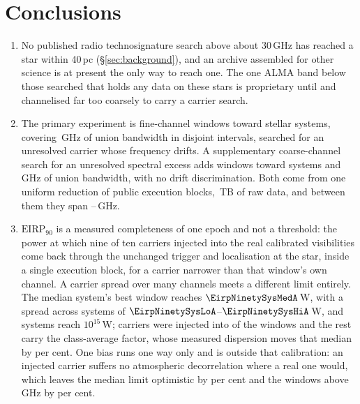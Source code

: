 \section{Conclusions}
\label{sec:conclusions}

\begin{enumerate}[leftmargin=1.6em,itemsep=4pt,topsep=4pt,parsep=0pt]

\item No published radio technosignature search above about 30\,GHz has
reached a star within 40\,pc (\S\ref{sec:background}), and an archive
assembled for other science is at present the only way to reach one. The one
ALMA band below those searched that holds any data on these stars is
proprietary until \SbBoneRelYear{} and channelised far too coarsely to carry
a carrier search.

\item The primary experiment is \NWinA{} fine-channel windows toward
\NSysClassA{} stellar systems, covering \CvUnionA\,GHz of union bandwidth in
\CovNIslands{} disjoint intervals, searched for an unresolved carrier whose
frequency drifts. A supplementary coarse-channel search for an unresolved spectral
excess adds \NWinB{} windows toward \PrSysClassB{} systems and
\CvUnionB\,GHz of union bandwidth, with no drift discrimination. Both come
from one uniform reduction of \NEB{} public execution blocks,
\TotalDataTB\,TB of raw data, and between them they span
\SurvFreqLo--\SurvFreqHi\,GHz.

\item $\mathrm{EIRP}_{90}$ is a measured completeness of one epoch and not a
threshold: the power at which nine of ten carriers
injected into the real calibrated visibilities come back through the
unchanged trigger and localisation at the star, inside a single execution
block, for a carrier narrower than that window's own channel. A carrier
spread over many channels meets a different limit entirely. The median
system's best window reaches $\EirpNinetySysMedA$\,W, with a spread across
systems of $\EirpNinetySysLoA$--$\EirpNinetySysHiA$\,W, and
\NSysEfifteen{} systems reach $10^{15}$\,W; carriers were injected into
\SensNInj{} of the \NWinA{} windows and the rest carry the class-average
factor, whose measured dispersion moves that median by \ScRsMedShiftPct{} per
cent. One bias runs one way only and is outside that calibration: an injected
carrier suffers no atmospheric decorrelation where a real one would, which
leaves the median limit optimistic by \SensDecorPct{} per cent and the
windows above \SensDecorHiGHz\,GHz by \SensDecorHiPct{} per cent.


\end{enumerate}
